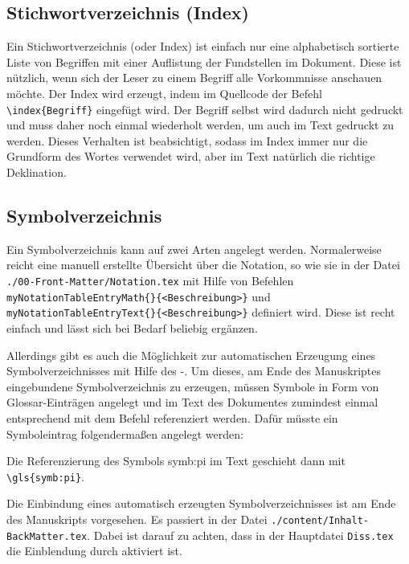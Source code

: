 \subsection{Stichwortverzeichnis (Index)}%
\label{sec:Index}
%
Ein Stichwortverzeichnis (oder
Index)
ist einfach nur eine alphabetisch sortierte Liste von Begriffen mit einer Auflistung der Fundstellen im Dokument.
Diese ist nützlich, wenn sich der Leser zu einem Begriff alle Vorkommnisse anschauen möchte.
Der Index wird erzeugt, indem im Quellcode der Befehl \verb+\index{Begriff}+
eingefügt wird. Der Begriff selbst wird dadurch nicht gedruckt und muss daher
noch einmal wiederholt werden, um auch im Text gedruckt zu werden. Dieses Verhalten
ist beabsichtigt, sodass im Index immer nur die Grundform des Wortes verwendet
wird, aber im Text natürlich die richtige Deklination.


\subsection{Symbolverzeichnis}%
\label{sec:Symbolverz}
%
Ein Symbolverzeichnis kann auf zwei Arten angelegt werden.
Normalerweise reicht eine manuell erstellte Übersicht über die Notation,
so wie sie in der Datei \texttt{./00-Front-Matter/Notation.tex}
mit Hilfe von Befehlen
\texttt{\bs myNotationTableEntryMath\{<Mathe-Ausdruck>\}\{<Beschreibung>\}}
und
\texttt{\bs myNotationTableEntryText\{<Text-Ausdruck>\}\{<Beschreibung>\}}
definiert wird.
Diese ist recht einfach und lässt sich bei Bedarf beliebig ergänzen.

Allerdings gibt es auch die Möglichkeit zur automatischen Erzeugung eines
Symbolverzeichnisses mit Hilfe des -.
Um dieses, am Ende des Manuskriptes eingebundene Symbolverzeichnis zu erzeugen,
müssen Symbole in Form von Glossar-Einträgen angelegt und im Text des Dokumentes
zumindest einmal entsprechend mit dem Befehl  referenziert werden.
Dafür müsste ein Symboleintrag folgendermaßen angelegt werden:
\begin{latex}[caption={Definition eines Symboleintrages},label={lst:SymbEntry}]
\end{latex}
Die Referenzierung des Symbols \gls{symb:pi} im Text geschieht dann mit \verb+\gls{symb:pi}+.

Die Einbindung eines automatisch erzeugten Symbolverzeichnisses ist am Ende des Manuskripts vorgesehen.
Es passiert in der Datei
\texttt{./content/Inhalt-BackMatter.tex}.
Dabei ist darauf zu achten, dass in der Hauptdatei \texttt{Diss.tex}
die Einblendung durch  aktiviert ist.
